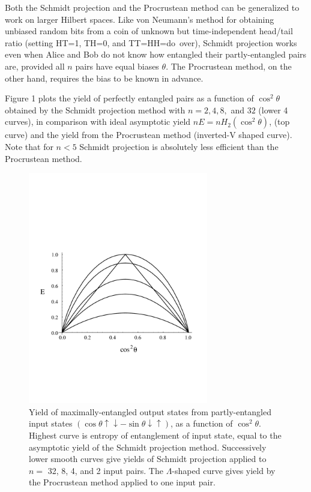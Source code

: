 Both the Schmidt projection and the Procrustean method
can be generalized to work on larger Hilbert spaces.
Like von Neumann's method for obtaining unbiased random bits from
a coin of unknown but time-independent head/tail ratio
(setting HT=1, TH=0, and TT=HH=\mbox{do over}),
Schmidt projection works even when Alice and Bob do not know how
entangled their partly-entangled pairs are, provided all $n$
pairs have equal biases $\theta$.  The Procrustean method, on the
other hand, requires the bias to be known in advance.
 
Figure 1 plots the yield of perfectly entangled pairs
as a function of $\cos^2\theta$ obtained by the Schmidt projection method
with $n=2,4,8,$ and $32$ (lower 4 curves), in comparison with
ideal asymptotic yield $nE=nH_2(\cos^2\theta)$, (top curve) and the
yield from the Procrustean method (inverted-V shaped curve).
Note that for $n<5$ Schmidt projection is absolutely less
efficient than the Procrustean method.
 
\begin{figure}[tp]
\includegraphics[height=4in]{concentration_figure.pdf}
\caption{\small
Yield of maximally-entangled output states from partly-entangled input
states $(\cos\theta \uparrow\downarrow-\sin\theta\downarrow\uparrow)$,
as a function of $\cos^2\theta$.
Highest curve is entropy of entanglement of input state,
equal to the asymptotic yield of the Schmidt projection method.
Successively lower smooth curves give yields of Schmidt projection
applied to $n=$ 32, 8, 4, and 2 input pairs.
The $\Lambda$-shaped curve gives yield by the Procrustean method
applied to one input pair.}
\end{figure}

